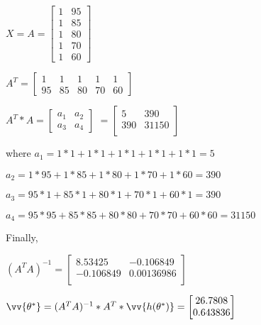 \documentclass[12pt]{article}
\begin{document}
\begin{enumerate}
\begin{enumerate}
                    $ X = A = \begin{bmatrix}
                            1 & 95 \\
                            1 & 85 \\
                            1 & 80 \\
                            1 & 70 \\
                            1 & 60
                        \end{bmatrix} $

                    $A^T = \begin{bmatrix}
                            1  & 1  & 1  & 1  & 1  \\
                            95 & 85 & 80 & 70 & 60
                        \end{bmatrix} $

                    $A^T*A = \begin{bmatrix}
                            a_1 & a_2 \\%
                            a_3 & a_4
                        \end{bmatrix}$
                    $ = \begin{bmatrix}
                            5   & 390   \\
                            390 & 31150 \\
                        \end{bmatrix}$

                    where $a_1 = 1*1 + 1*1 + 1*1 + 1*1 + 1*1 = 5$

                    $a_2 = 1*95 + 1*85 + 1*80 + 1*70 + 1*60 = 390$

                    $a_3 = 95*1 + 85*1 + 80*1 + 70*1 + 60*1 = 390$

                    $a_4 = 95*95 + 85*85 + 80*80 + 70*70 + 60*60 = 31150$

                    Finally,

                    $ (A^T A)^{-1} = \begin{bmatrix}
                            8.53425   & -0.106849  \\
                            -0.106849 & 0.00136986 \\
                        \end{bmatrix}$

                    $ \vv{\theta^*} = (A^T A)^{-1}*A^T*\vv{h(\theta^*)} = \begin{bmatrix}
                            26.7808  \\
                            0.643836 \\
                        \end{bmatrix}$


\end{enumerate}
\end{enumerate}
\end{document}
